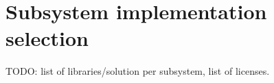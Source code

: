 \section{Subsystem implementation selection}
TODO: list of libraries/solution per subsystem, list of licenses.